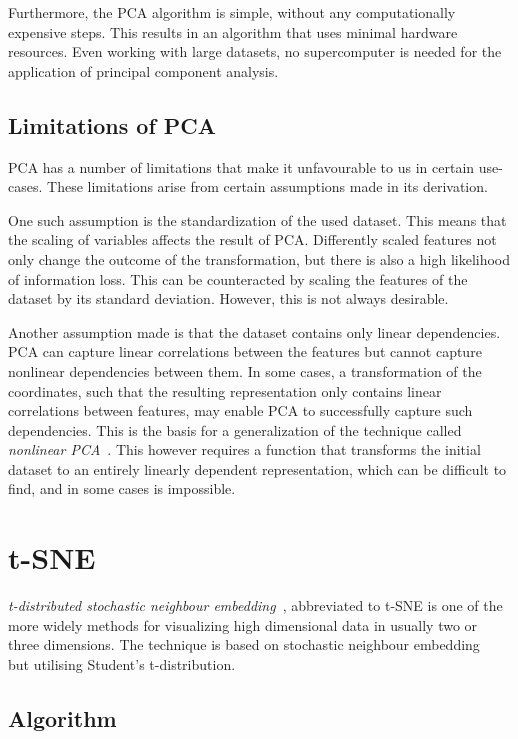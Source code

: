 Furthermore, the PCA algorithm is simple, without any computationally expensive steps. This results in an algorithm that uses minimal hardware resources. Even working with large datasets, no supercomputer is needed for the application of principal component analysis.

\subsection{Limitations of PCA}\label{subsec:limitations-of-pca}


PCA has a number of limitations that make it unfavourable to us in certain use-cases. These limitations arise from certain assumptions made in its derivation.

One such assumption is the standardization of the used dataset. This means that the scaling of variables affects the result of PCA. Differently scaled features not only change the outcome of the transformation, but there is also a high likelihood of information loss. This can be counteracted by scaling the features of the dataset by its standard deviation. However, this is not always desirable.

Another assumption made is that the dataset contains only linear dependencies. PCA can capture linear correlations between the features but cannot capture nonlinear dependencies between them. In some cases, a transformation of the coordinates, such that the resulting representation only contains linear correlations between features, may enable PCA to successfully capture such dependencies. This is the basis for a generalization of the technique called \textit{nonlinear PCA}~\cite{bib:nonlinpca}. This however requires a function that transforms the initial dataset to an entirely linearly dependent representation, which can be difficult to find, and in some cases is impossible.

\section{t-SNE}\label{sec:t-sne}

\textit{t-distributed stochastic neighbour embedding}~\cite{bib:tsne}, abbreviated to t-SNE is one of the more widely methods for visualizing high dimensional data in usually two or three dimensions. The technique is based on stochastic neighbour embedding~\cite{bib:sne} but utilising Student's t-distribution.

\subsection{Algorithm}

